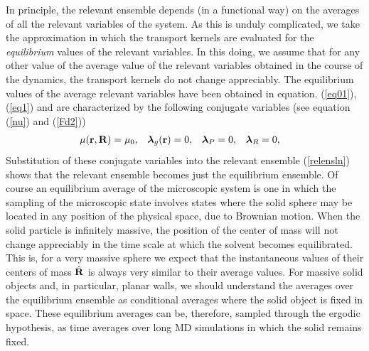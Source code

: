 \documentclass[b5paper,openright,10pt]{book}
\begin{document}
In principle, the  relevant ensemble depends (in a  functional way) on
the averages of all the relevant  variables of the system.  As this is
unduly complicated, we  take the approximation in  which the transport
kernels are evaluated for the {\em equilibrium} values of the relevant
variables. In  this doing, we assume  that for any other  value of the
average value of the relevant variables  obtained in the course of the
dynamics,  the  transport  kernels  do not  change  appreciably.   The
equilibrium  values  of  the  average  relevant  variables  have  been
obtained in  equation. (\ref{eq01}),  (\ref{eq1}) and are  characterized by
the following conjugate variables (see equation (\ref{nu}) and (\ref{Fd2}))
\begin{align}
  \mu({\bf r},{\bf R})=\mu_0, &&
  \boldsymbol{\lambda}_g({\bf r})=0,&&
  \boldsymbol{\lambda}_P=0,&&
  \boldsymbol{\lambda}_R=0,&&
\end{align}
Substitution of  these conjugate variables into  the relevant ensemble
(\ref{relensln})  shows that  the relevant  ensemble becomes  just the
equilibrium  ensemble.   Of  course  an  equilibrium  average  of  the
microscopic system  is one  in which the  sampling of  the microscopic
state involves states where the solid sphere may be located in any 
position of the physical space, due to Brownian motion. When the solid
particle is  infinitely massive,  the position of  the center  of mass
will not  change appreciably in  the time  scale at which  the solvent
becomes equilibrated.   This is, for  a very massive sphere  we expect
that the instantaneous  values of their centers of  mass $\hat{\bf R}$
is  always very  similar to  their average  values. For  massive solid
objects and,  in particular,  planar walls,  we should  understand the
averages over  the equilibrium ensemble as  conditional averages where
the solid  object is fixed  in space.  These equilibrium  averages can
be,  therefore,  sampled  through  the  ergodic  hypothesis,  as  time
averages over long MD simulations in which the solid remains fixed.
\end{document}
